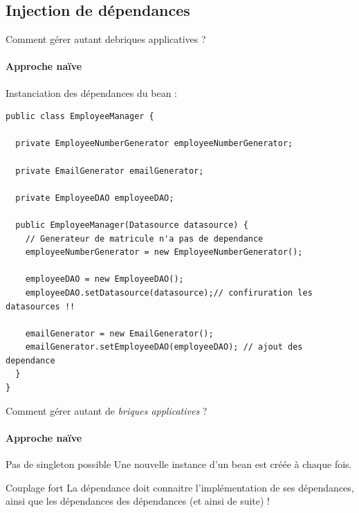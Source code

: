 \documentclass[compress]{beamer}%
\begin{document}


\subsection{Injection de dépendances}

\begin{frame}[containsverbatim]{Comment gérer autant debriques applicatives ?}
	\framesubtitle{Approche naïve}
	
	Instanciation des dépendances du bean :
	\begin{lstlisting}
public class EmployeeManager {
	
  private EmployeeNumberGenerator employeeNumberGenerator;		
  
  private EmailGenerator emailGenerator;		
  
  private EmployeeDAO employeeDAO;
		
  public EmployeeManager(Datasource datasource) {
    // Generateur de matricule n'a pas de dependance
    employeeNumberGenerator = new EmployeeNumberGenerator();
			
    employeeDAO = new EmployeeDAO();
    employeeDAO.setDatasource(datasource);// confiruration les datasources !!
			
    emailGenerator = new EmailGenerator();
    emailGenerator.setEmployeeDAO(employeeDAO); // ajout des dependance
  }
}
	\end{lstlisting}
	
\end{frame}

\begin{frame}{Comment gérer autant de \emph{briques applicatives} ?}
	\framesubtitle{Approche naïve}
	
	\begin{alertblock}{Pas de singleton possible}
	Une nouvelle instance d'un bean est créée à chaque fois.
	\end{alertblock}
	
	\pause
	\begin{alertblock}{Couplage fort}
	La dépendance doit connaitre l'implémentation de ses dépendances, ainsi que les dépendances des dépendances (et ainsi de suite) !
	\end{alertblock}
	
\end{frame}
\end{document}
